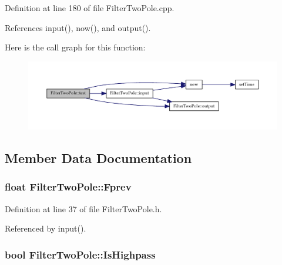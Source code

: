 Definition at line 180 of file Filter\+Two\+Pole.\+cpp.



References input(), now(), and output().



Here is the call graph for this function\+:
\nopagebreak
\begin{figure}[H]
\begin{center}
\leavevmode
\includegraphics[width=350pt]{struct_filter_two_pole_a9d600c9c4c07239f34740f07a1487c2a_cgraph}
\end{center}
\end{figure}




\subsection{Member Data Documentation}
\subsubsection[{\texorpdfstring{Fprev}{Fprev}}]{\setlength{\rightskip}{0pt plus 5cm}float Filter\+Two\+Pole\+::\+Fprev}\hypertarget{struct_filter_two_pole_afeb31882d0e8506a82f4b8cbd5745488}{}\label{struct_filter_two_pole_afeb31882d0e8506a82f4b8cbd5745488}


Definition at line 37 of file Filter\+Two\+Pole.\+h.



Referenced by input().

\subsubsection[{\texorpdfstring{Is\+Highpass}{IsHighpass}}]{\setlength{\rightskip}{0pt plus 5cm}bool Filter\+Two\+Pole\+::\+Is\+Highpass}\hypertarget{struct_filter_two_pole_abda0e3d8797b98981b5827814b56b329}{}\label{struct_filter_two_pole_abda0e3d8797b98981b5827814b56b329}


